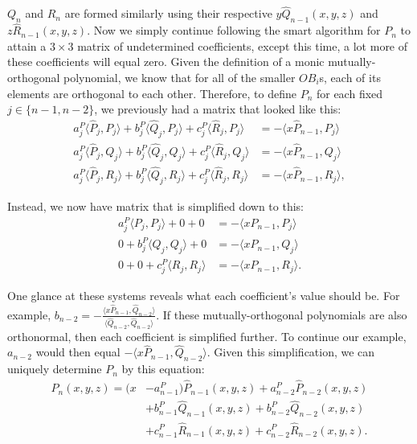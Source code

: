 \documentclass[letterpaper, 12pt]{article}
\begin{document}
\noindent $Q_n$ and $R_n$ are formed similarly using their respective $y\hat{Q}_{n-1}(x, y, z)$ and $z\hat{R}_{n-1}(x, y, z)$. Now we simply continue following the smart algorithm for $P_n$ to attain a $3\times 3$ matrix of undetermined coefficients, except this time, a lot more of these coefficients will equal zero. Given the definition of a monic mutually-orthogonal polynomial, we know that for all of the smaller $OB_i$s, each of its elements are orthogonal to each other. Therefore, to define $P_n$ for each fixed $j \in \{n-1, n-2\}$, we previously had a matrix that looked like this:
\begin{align*}
	a_j^P\langle \hat{P}_j, P_j \rangle + b_j^P\langle \hat{Q}_j, P_j \rangle + c_j^P\langle \hat{R}_j, P_j \rangle &= - \langle x\hat{P}_{n-1}, P_j\rangle \\
	a_j^P\langle \hat{P}_j, Q_j \rangle + b_j^P\langle \hat{Q}_j, Q_j \rangle + c_j^P\langle \hat{R}_j, Q_j \rangle &= - \langle x\hat{P}_{n-1}, Q_j\rangle \\
	a_j^P\langle \hat{P}_j, R_j \rangle + b_j^P\langle \hat{Q}_j, R_j \rangle + c_j^P\langle \hat{R}_j, R_j \rangle&= - \langle x\hat{P}_{n-1}, R_j\rangle,
\end{align*}

\noindent Instead, we now have matrix that is simplified down to this:
\begin{align*}
	a_j^P\langle P_j, P_j \rangle +0 +0&= - \langle xP_{n-1}, P_j\rangle \\
	0+ b_j^P\langle Q_j, Q_j\rangle +0&= - \langle xP_{n-1}, Q_j\rangle \\
	0+ 0+ c_j^P\langle R_j, R_j \rangle&= - \langle xP_{n-1}, R_j\rangle.
\end{align*}

\noindent One glance at these systems reveals what each coefficient's value should be. For example, $b_{n-2} = -\frac{\langle x\hat{P}_{n-1}, \hat{Q}_{n-2}\rangle}{\langle \hat{Q}_{n-2}, \hat{Q}_{n-2}\rangle}$. If these mutually-orthogonal polynomials are also orthonormal, then each coefficient is simplified further. To continue our example, $a_{n-2}$ would then equal $-\langle x\hat{P}_{n-1}, \hat{Q}_{n-2}\rangle$. Given this simplification, we can uniquely determine $P_n$ by this equation:
\begin{align*}
	P_n(x,y,z) = (x&-a_{n-1}^P)\hat{P}_{n-1}(x,y,z) + a_{n-2}^P\hat{P}_{n-2}(x,y,z) \\
				&+ b_{n-1}^P\hat{Q}_{n-1}(x,y,z) + b_{n-2}^P\hat{Q}_{n-2}(x,y,z) \\
				&+ c_{n-1}^P\hat{R}_{n-1}(x,y,z) + c_{n-2}^P\hat{R}_{n-2}(x,y,z).
\end{align*}
\end{document}
